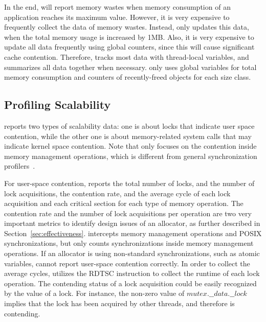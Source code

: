 In the end, \MP{} will report memory wastes when memory consumption of an application reaches its maximum value. However, it is very expensive to frequently collect the data of memory wastes. Instead, \MP{} only updates this data, when the total memory usage is increased by 1MB. Also, it is very expensive to update all data frequently using global counters, since this will cause significant cache contention. Therefore, \MP{} tracks most data with thread-local variables, and summarizes all data together when necessary. \MP{} only uses global variables for total memory consumption and counters of recently-freed objects for each size class. 

\subsection{Profiling Scalability}
\label{sec:profilingscale}

\MP{} reports two types of scalability data: one is about locks that indicate user space contention, while the other one is about memory-related system calls that may indicate kernel space contention. Note that \MP{} only focuses on the contention inside memory management operations, which is different from general synchronization profilers~\cite{SyncProf, SyncPerf, wPerf}.

For user-space contention, \MP{} reports the total number of locks, and the number of lock acquisitions, the contention rate, and the average cycle of each lock acquisition and each critical section for each type of memory operation. The contention rate and the number of lock acquisitions per operation are two very important metrics to identify design issues of an allocator, as further described in Section~\ref{sec:effectiveness}.  \MP{} intercepts memory management operations and POSIX synchronizations, but only counts synchronizations inside memory management operations. If an allocator is using non-standard synchronizations, such as atomic variables, \MP{} cannot report user-space contention correctly. In order to collect the average cycles, \MP{} utilizes the RDTSC instruction to collect the runtime of each lock operation. The contending status of a lock acquisition could be easily recognized by the value of a lock. For instance, the non-zero value of $mutex.\_\_data.\_\_lock$ implies that the lock has been acquired by other threads, and therefore is contending. 

